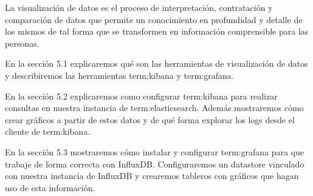 La visualización de datos es el proceso de interpretación, contratación y
comparación de datos que permite un conocimiento en profundidad y detalle de
los mismos de tal forma que se transformen en información comprensible para las
personas.

En la sección 5.1 explicaremos qué son las herramientas de visualización de
datos y describiremos las herramientas \gls{term:kibana} y \gls{term:grafana}.

En la sección 5.2 explicaremos como configurar \gls{term:kibana} para realizar
consultas en nuestra instancia de \gls{term:elasticsearch}. Además mostraremos
cómo crear gráficos a partir de estos datos y de qué forma explorar los logs
desde el cliente  de \gls{term:kibana}.

En la sección 5.3 mostraremos cómo instalar y configurar \gls{term:grafana}
para que trabaje de forma correcta con InfluxDB. Configuraremos un datastore
vinculado con nuestra instancia de InfluxDB y crearemos tableros con gráficos
que hagan uso de esta información.

